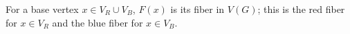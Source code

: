 \begin{definition}
For a base vertex \(x\in V_R\cup V_B\), \(F(x)\) is its fiber in \(V(G)\);
this is the red fiber for \(x\in V_R\) and the blue fiber for \(x\in V_B\).
\end{definition}
